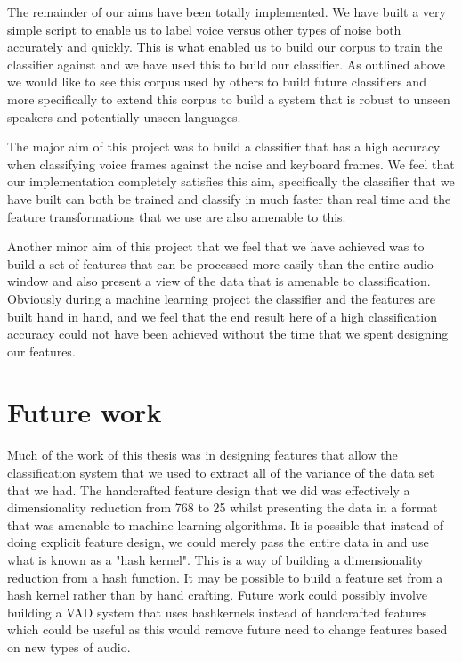 \documentclass[ %
                    author={Sam Phippen},
                supervisor={Dr. Rafal Bogacz},
                     title={Real time voice activity detectors in noisy personal computing environments},
                  subtitle={},
                    degree={MEng},
                      year={2012} ]{thesis}
\begin{document}
The remainder of our aims have been totally implemented. We have built a very
simple script to enable us to label voice versus other types of noise both
accurately and quickly. This is what enabled us to build our corpus to train
the classifier against and we have used this to build our classifier. As
outlined above we would like to see this corpus used by others to build future
classifiers and more specifically to extend this corpus to build a system that
is robust to unseen speakers and potentially unseen languages.

The major aim of this project was to build a classifier that has a high
accuracy when classifying voice frames against the noise and keyboard frames.
We feel that our implementation completely satisfies this aim, specifically the
classifier that we have built can both be trained and classify in much faster
than real time and the feature transformations that we use are also amenable
to this.

Another minor aim of this project that we feel that we have achieved was to
build a set of features that can be processed more easily than the entire audio
window and also present a view of the data that is amenable to classification.
Obviously during a machine learning project the classifier and the features are
built hand in hand, and we feel that the end result here of a high
classification accuracy could not have been achieved without the time that we
spent designing our features.

\section{Future work}

Much of the work of this thesis was in designing features that allow the
classification system that we used to extract all of the variance of the data
set that we had. The handcrafted feature design that we did was effectively a
dimensionality reduction from 768 to 25 whilst presenting the data in a format
that was amenable to machine learning algorithms. It is possible that instead
of doing explicit feature design, we could merely pass the entire data in and
use what is known as a "hash kernel"\cite{Weinberger}. This is a way of
building a dimensionality reduction from a hash function. It may be possible to
build a feature set from a hash kernel rather than by hand crafting. Future
work could possibly involve building a VAD system that uses hashkernels instead
of handcrafted features which could be useful as this would remove future need
to change features based on new types of audio.
\end{document}
